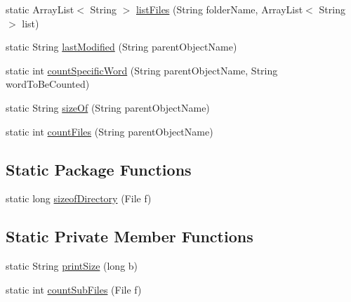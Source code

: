 \begin{DoxyCompactItemize}
\item 
static Array\-List$<$ String $>$ \hyperlink{classcom_1_1poly_1_1nlp_1_1filekommander_1_1file_1_1actions_1_1_file_action_utils_a1780994dac039e63b9b2c8971259d044}{list\-Files} (String folder\-Name, Array\-List$<$ String $>$ list)
\item 
static String \hyperlink{classcom_1_1poly_1_1nlp_1_1filekommander_1_1file_1_1actions_1_1_file_action_utils_a68fa55cc4deac83ac2920da1dd442172}{last\-Modified} (String parent\-Object\-Name)
\item 
static int \hyperlink{classcom_1_1poly_1_1nlp_1_1filekommander_1_1file_1_1actions_1_1_file_action_utils_a06dfce7b70b23f97847c06172ddab4b6}{count\-Specific\-Word} (String parent\-Object\-Name, String word\-To\-Be\-Counted)
\item 
static String \hyperlink{classcom_1_1poly_1_1nlp_1_1filekommander_1_1file_1_1actions_1_1_file_action_utils_a1221ebf805c2cc881c40fad828f64861}{size\-Of} (String parent\-Object\-Name)
\item 
static int \hyperlink{classcom_1_1poly_1_1nlp_1_1filekommander_1_1file_1_1actions_1_1_file_action_utils_a5159f72af191d97005ade7a8b7a95ac1}{count\-Files} (String parent\-Object\-Name)
\end{DoxyCompactItemize}
\subsection*{Static Package Functions}
\begin{DoxyCompactItemize}
\item 
static long \hyperlink{classcom_1_1poly_1_1nlp_1_1filekommander_1_1file_1_1actions_1_1_file_action_utils_a4eb94d6fbf8aed90a068180e88b8e9cd}{sizeof\-Directory} (File f)
\end{DoxyCompactItemize}
\subsection*{Static Private Member Functions}
\begin{DoxyCompactItemize}
\item 
static String \hyperlink{classcom_1_1poly_1_1nlp_1_1filekommander_1_1file_1_1actions_1_1_file_action_utils_a7c29f2257b29d8d10c39a87b351093fb}{print\-Size} (long b)
\item 
static int \hyperlink{classcom_1_1poly_1_1nlp_1_1filekommander_1_1file_1_1actions_1_1_file_action_utils_a1e5c3dca1c8116ae57515c36edeae4d9}{count\-Sub\-Files} (File f)
\end{DoxyCompactItemize}
